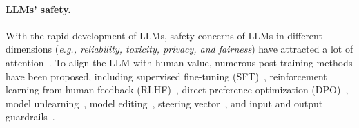 \paragraph{LLMs' safety.}
With the rapid development of LLMs, safety concerns of LLMs in different dimensions (\emph{e.g., reliability, toxicity, privacy, and fairness}) have attracted a lot of attention~\cite{liu2023trustworthy, wang2024decodingtrust, sun2024trustllm, harmbench, xie2024sorrybench, ren2024derail}. To align the LLM with human value, numerous post-training methods have been proposed, including supervised fine-tuning (SFT)~\cite{zong2024vlguard, hu2024vlsbench}, reinforcement learning from human feedback (RLHF)~\cite{ouyang2022training, spa-vl}, direct preference optimization (DPO)~\cite{rafailov2024direct, meng2024simpo}, model unlearning~\cite{li2024wmdp, zhang2024safeunlearning}, model editing~\cite{wang2024detoxifying, wang2024model, cq}, steering vector~\cite{li2023inferencetime, qian2024towards, zhang2024better}, and input and output guardrails~\cite{lu2024sofa, wallace2024instruction, ji2024aligner}. %


